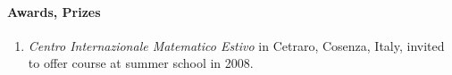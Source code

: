 \paragraph{Awards, Prizes}
\begin{enumerate}
\item {\sl Centro Internazionale Matematico
Estivo} in Cetraro, Cosenza, Italy, invited to offer course at
summer school in 2008.
\end{enumerate}














